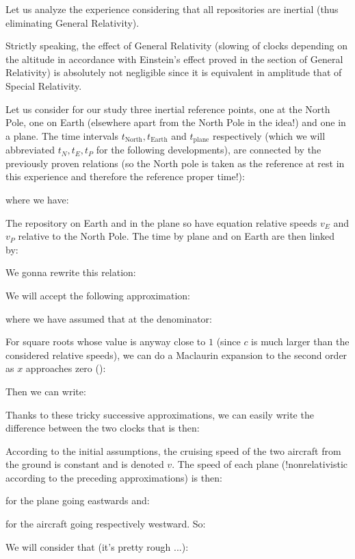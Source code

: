 	Let us analyze the experience considering that all repositories are inertial (thus eliminating General Relativity).
	\begin{tcolorbox}[title=Remark,colframe=black,arc=10pt]
	Strictly speaking, the effect of General Relativity (slowing of clocks depending on the altitude in accordance with Einstein's effect proved in the section of General Relativity) is absolutely not negligible since it is equivalent in amplitude that of Special Relativity.
	\end{tcolorbox}
	Let us consider for our study  three inertial reference points, one at the North Pole, one on Earth (elsewhere apart from the North Pole in the idea!) and one in a plane. The time intervals $t_{\text{North}},t_{\text{Earth}}$ and $t_{\text{plane}}$ respectively (which we will abbreviated $t_N,t_E,t_P$ for the following developments), are connected by the previously proven relations (so the North pole is taken as the reference at rest in this experience and therefore the reference proper time!):
	
	where we have:
	
	The repository on Earth and in the plane so have equation relative speeds $v_E$ and $v_P$ relative to the North Pole. The time by plane and on Earth are then linked by:
	
	We gonna rewrite this relation:
	
	We will accept the following approximation:
	
	where we have assumed that at the denominator:
	
	For square roots whose value is anyway close to $1$ (since $c$ is much larger than the considered relative speeds), we can do a Maclaurin expansion to the second order as $x$ approaches zero ():
	
	Then we can write:
	
	Thanks to these tricky successive approximations, we can easily write the difference between the two clocks that is then:
	
	According to the initial assumptions, the cruising speed of the two aircraft from the ground is constant and is denoted $v$. The speed of each plane (!nonrelativistic according to the preceding approximations) is then:
	
	for the plane going eastwards and:
	
	for the aircraft going respectively westward. So:
	
	We will consider that (it's pretty rough ...):
	
